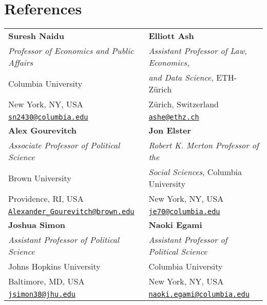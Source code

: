 \documentclass[letterpaper,11pt]{article}
\begin{document}
%
%
%


\clearpage

\section{References} 

\begin{tabularx}{\textwidth}{@{}bb@{}}
	\textbf{Suresh Naidu} & \textbf{Elliott Ash} \\
	\textit{Professor of Economics and Public Affairs} & \textit{Assistant Professor of Law, Economics,} \\
	Columbia University & \textit{and Data Science}, ETH-Z\"{u}rich \\
	New York, NY, USA & Z\"urich, Switzerland \\
	\href{mailto:sn2430@columbia.edu}{\texttt{sn2430@columbia.edu}} & \href{mailto:ashe@ethz.ch}{\texttt{ashe@ethz.ch}} \\[2ex]
	
	\textbf{Alex Gourevitch} & \textbf{Jon Elster} \\
	\textit{Associate Professor of Political Science} & \textit{Robert K. Merton Professor of the} \\
	Brown University & \textit{Social Sciences}, Columbia University \\
	Providence, RI, USA & New York, NY, USA \\
	\href{mailto:Alexander_Gourevitch@brown.edu}{\texttt{Alexander\_Gourevitch@brown.edu}} & \href{mailto:je70@columbia.edu}{\texttt{je70@columbia.edu}} \\[2ex]
	
	\textbf{Joshua Simon} & \textbf{Naoki Egami} \\
	\textit{Assistant Professor of Political Science} & \textit{Assistant Professor of Political Science} \\
	Johns Hopkins University & Columbia University \\
	Baltimore, MD, USA & New York, NY, USA \\
	\href{mailto:jsimon38@jhu.edu}{\texttt{jsimon38@jhu.edu}} & \href{mailto:naoki.egami@columbia.edu}{\texttt{naoki.egami@columbia.edu}} \\
\end{tabularx}
\end{document}
